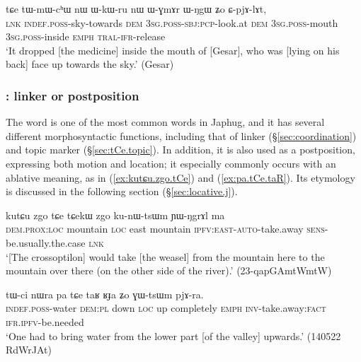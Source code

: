 \begin{exe}
\ex \label{ex:tWmWchW} 
\gll tɕe tɯ-mɯ-cʰɯ nɯ ɯ-kɯ-ru nɯ ɯ-ɣmɤr ɯ-ŋgɯ ʑo ɕ-pjɤ-lɤt, \\
\textsc{lnk} \textsc{indef}.\textsc{poss}-sky-towards \textsc{dem} \textsc{3sg}.\textsc{poss}-\textsc{sbj}:\textsc{pcp}-look.at \textsc{dem} \textsc{3sg}.\textsc{poss}-mouth \textsc{3sg}.\textsc{poss}-inside \textsc{emph} \textsc{tral}-\textsc{ifr}-release \\
\glt `It dropped [the medicine] inside the mouth of [Gesar], who was [lying on his back] face up towards the sky.' (Gesar)
\end{exe}

\subsubsection{: linker or postposition} \label{sec:tCe.postposition}
The word  is one of the most common words in Japhug, and it has several different morphosyntactic functions, including that of linker (§\ref{sec:coordination}) and topic marker (§\ref{sec:tCe.topic}). In addition, it is also used as a postposition, expressing both motion and location; it especially commonly occurs with an ablative meaning, as in (\ref{ex:kutɕu.zgo.tCe}) and (\ref{ex:pa.tCe.taR}). Its etymology is discussed in the following section (§\ref{sec:locative.j}).

\begin{exe}
\ex \label{ex:kutɕu.zgo.tCe}
\gll kutɕu zgo tɕe tɕekɯ zgo ku-nɯ-tsɯm ɲɯ-ŋgrɤl ma \\
\textsc{dem}.\textsc{prox}:\textsc{loc} mountain \textsc{loc} east mountain \textsc{ipfv}:\textsc{east}-\textsc{auto}-take.away \textsc{sens}-be.usually.the.case \textsc{lnk} \\
\glt `[The crossoptilon] would take [the weasel] from the mountain here to the mountain over there (on the other side of the river).' (23-qapGAmtWmtW) 
\end{exe}

\begin{exe}
\ex \label{ex:pa.tCe.taR}
\gll tɯ-ci nɯra pa tɕe taʁ ʁɟa ʑo ɣɯ-tsɯm pjɤ-ra. \\
\textsc{indef}.\textsc{poss}-water \textsc{dem}:\textsc{pl} down \textsc{loc} up completely \textsc{emph} \textsc{inv}-take.away:\textsc{fact} \textsc{ifr}.\textsc{ipfv}-be.needed \\
\glt `One had to bring water from the lower part [of the valley] upwards.' (140522 RdWrJAt)
\end{exe}

